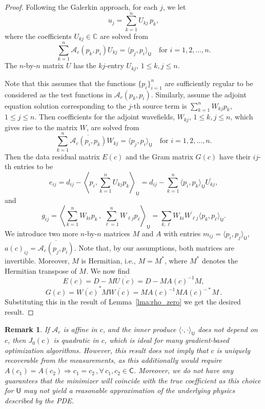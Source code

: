 \documentclass[12pt]{amsart}
\newtheorem{rem}{Remark}
\begin{document}
\begin{proof}
Following the Galerkin approach, for each $j$, we let
\[
u_j = \sum_{k=1}^n U_{kj}\,p_k, 
\]
where the coefficients $U_{kj} \in \mathbb{C}$ are solved from
\[
\sum_{k=1}^n \mathcal{A}_c(p_k, p_i)U_{kj} = \langle p_j, p_i\rangle_\mathsf{U} \quad \text{for $i=1, 2, \ldots, n$}.
\]
The $n$-by-$n$ matrix $U$ has the $kj$-entry $U_{kj}$, $1\leq k,j \leq n$.

Note that this assumes that the functions $\{p_i\}_{i=1}^n$ are sufficiently regular to be considered as the test functions in $\mathcal{A}_c(p_k, p_i)$.
Similarly, assume the adjoint equation solution corresponding to the $j$-th source term is $\sum_{k=1}^n{W_{kj}} p_k $, $1\leq j \leq n$. Then coefficients  for the adjoint wavefields, $W_{kj}$, $1\leq k,j\leq n$, which gives rise to the matrix $W$, are solved from 
\[
\sum_{k=1}^n \overline{\mathcal{A}_c(p_i, p_k)}W_{kj} = \langle p_j, p_i\rangle_\mathsf{U} \quad \text{for $i=1, 2, \ldots, n$}.
\]
Then the data residual matrix $E(c)$ and the Gram matrix $G(c)$ have their $ij$-th entries to be
\[
e_{ij} = d_{ij} - \left\langle p_i, \sum_{k=1}^n U_{kj}p_k\right\rangle_{\mathsf{U}} = d_{ij} - \sum_{k=1}^n \langle p_i, p_k \rangle_\mathsf{U}\overline{U_{kj}},
\]
and
\[
g_{ij} = \left\langle \sum_{k=1}^n W_{ki}p_k\,,\, \sum_{\ell=1}^n W_{\ell j}p_\ell \right\rangle_\mathsf{U} = \sum_{k,\ell} W_{ki} \overline{W_{\ell j}} \langle p_k, p_\ell \rangle_\mathsf{U}.
\]
We introduce two more  $n$-by-$n$ matrices $M$ and $A$ 
 with entries $m_{ij} = \langle p_i, p_j \rangle_{\mathsf{U}}$, $a(c)_{ij} = \overline{\mathcal{A}_c(p_j, p_i)}$. Note that, by our assumptions, both matrices are invertible. Moreover, $M$ is Hermitian, i.e., $M = M^*$,  where $M^*$ denotes the Hermitian transpose of $M$. We now find
\[
E(c) = D - M\overline{U(c)} =  D - MA(c)^{-1}M,
\]
\[
G(c) = \overline{W(c)}^* M \overline{W(c)} = MA(c)^{-1}MA(c)^{-*}M\,.
\]
Substituting this in the result of Lemma~\ref{lma:rho_zero} we get the desired result.
\end{proof}

\begin{rem}\label{rem:quadratic}
If $\mathcal{A}_c$ is affine in $c$,  and the inner produce $\langle \cdot, \cdot \rangle_{\mathsf{U}}$ does not depend on $c$,  then $J_0(c)$ is \textit{quadratic} in $c$, which is ideal for many gradient-based optimization algorithms. However, this result does \emph{not} imply that $c$ is uniquely recoverable from the measurements, as this additionally would require $A(c_1) = A(c_2) \Rightarrow c_1 = c_2 \,, \forall \, c_1, c_2 \in \mathsf{C}$.  Moreover, we do not have any guarantees that the minimizer will coincide with the true coefficient as this choice for $\mathsf{U}$ may not yield a reasonable approximation of the underlying physics described by the PDE.
\end{rem}
\end{document}

